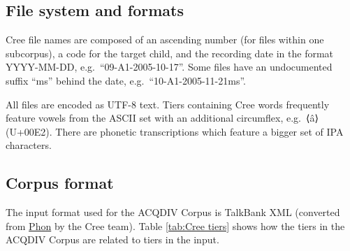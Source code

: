 \documentclass[a4paper, 11pt]{book}
\begin{document}
\subsection{File system and formats}

Cree file names are composed of an ascending number (for files within one subcorpus), a code for the target child, and the recording date in the format YYYY-MM-DD, e.g.\ “09-A1-2005-10-17”. Some files have an undocumented suffix “ms” behind the date, e.g.\ “10-A1-2005-11-21ms”. 

All files are encoded as UTF-8 text. Tiers containing Cree words frequently feature vowels from the ASCII set with an additional circumflex, e.g.\ ⟨â⟩ (U+00E2). There are phonetic transcriptions which feature a bigger set of IPA characters. 


\subsection{Corpus format}

The input format used for the ACQDIV Corpus is TalkBank XML (converted from \href{https://www.phon.ca/phontrac/wiki/Downloads}{Phon} by the Cree team). Table \autoref{tab:Cree tiers} shows how the tiers in the ACQDIV Corpus are related to tiers in the input.
\end{document}
